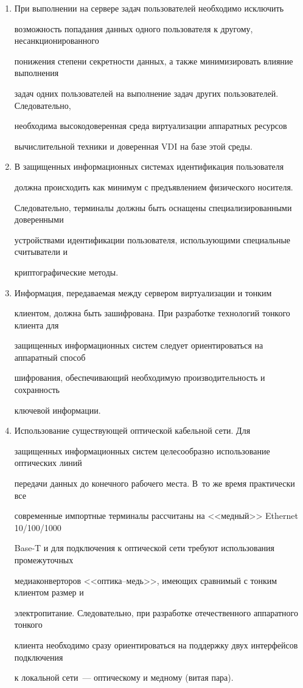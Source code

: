        \begin{enumerate}[1.]


       \item При выполнении на сервере задач пользователей необходимо исключить 


возможность попадания данных одного пользователя к другому, несанкционированного 


понижения степени секретности данных, а также минимизировать влияние выполнения 


задач одних пользователей на выполнение задач других пользователей. Следовательно, 


необходима высокодоверенная среда виртуализации аппаратных ресурсов 


вычислительной техники и доверенная VDI на базе этой среды.


       \item В защищенных информационных системах идентификация пользователя 


должна происходить как минимум с предъявлением физического носителя. 


Следовательно, терминалы должны быть оснащены специализированными доверенными 


устройствами идентификации пользователя, использующими специальные считыватели и 


криптографические методы. 


       \item Информация, передаваемая между сервером виртуализации и тонким 


клиентом, должна быть зашифрована. При разработке технологий тонкого клиента для 


защищенных информационных систем следует ориентироваться на аппаратный способ 


шифрования, обеспечивающий необходимую производительность и сохранность 


ключевой информации.


       \item Использование существующей оптической кабельной сети. Для 


защищенных информационных систем целесообразно использование оптических линий 


передачи данных до конечного рабочего места. В~то же время практически все 


современные импортные терминалы рассчитаны на <<медный>> Ethernet 10/100/1000 


Base-T и для подключения к оптической сети требуют использования промежуточных 


медиаконверторов <<оп\-ти\-ка--медь>>, имеющих сравнимый с тонким клиентом размер и 


электропитание. Следовательно, при разработке отечественного аппаратного тонкого 


клиента необходимо сразу ориентироваться на поддержку двух интерфейсов подключения 


к локальной сети~--- оптическому и медному (витая пара).


       \end{enumerate}


